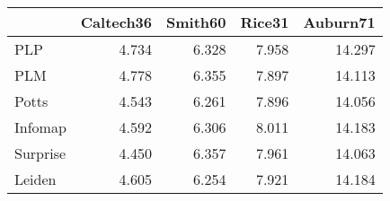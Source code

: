 \begin{tabular}{lrrrr}
\toprule
{} & Caltech36 & Smith60 & Rice31 & Auburn71 \\
\midrule
PLP      &     4.734 &   6.328 &  7.958 &   14.297 \\
PLM      &     4.778 &   6.355 &  7.897 &   14.113 \\
Potts    &     4.543 &   6.261 &  7.896 &   14.056 \\
Infomap  &     4.592 &   6.306 &  8.011 &   14.183 \\
Surprise &     4.450 &   6.357 &  7.961 &   14.063 \\
Leiden   &     4.605 &   6.254 &  7.921 &   14.184 \\
\bottomrule
\end{tabular}
